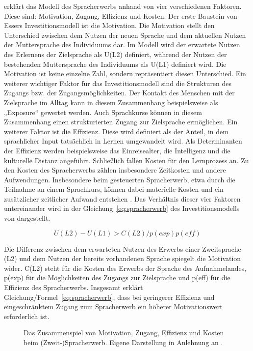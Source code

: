 \textcite{Esser:2006} erklärt das Modell des Spracherwerbs anhand von vier verschiedenen Faktoren. Diese sind: Motivation, Zugang, Effizienz und Kosten. Der erste Baustein von Essers Investitionsmodell ist die Motivation. Die Motivation stellt den Unterschied zwischen dem Nutzen der neuen Sprache und dem aktuellen Nutzen der Muttersprache des Individuums dar. Im Modell wird der erwartete Nutzen des Erlernens der Zielsprache als U(L2) definiert, während der Nutzen der bestehenden Muttersprache des Individuums als U(L1) definiert wird. Die Motivation ist keine einzelne Zahl, sondern repräsentiert diesen Unterschied. Ein weiterer wichtiger Faktor für das Investitionsmodell sind die Strukturen des Zugangs bzw. der Zugangsmöglichkeiten. Der Kontakt des Menschen mit der Zielsprache im Alltag kann in diesem Zusammenhang beispielsweise als „Exposure“ gewertet werden. Auch Sprachkurse können in diesem Zusammenhang einen strukturierten Zugang zur Zielsprache ermöglichen. Ein weiterer Faktor ist die Effizienz. Diese wird definiert als der Anteil, in dem sprachlicher Input tatsächlich in Lernen umgewandelt wird. Als Determinanten der Effizienz werden beispielsweise das Einreisealter, die Intelligenz und die kulturelle Distanz angeführt. Schließlich fallen Kosten für den Lernprozess an. Zu den Kosten des Spracherwerbs zählen insbesondere Zeitkosten und andere Aufwendungen. Insbesondere beim gesteuerten Spracherwerb, etwa durch die Teilnahme an einem Sprachkurs, können dabei materielle Kosten und ein zusätzlicher zeitlicher Aufwand entstehen \parencite[82--89]{Esser:2006}. Das Verhältnis dieser vier Faktoren untereinander wird in der Gleichung~\eqref{eq:spracherwerb} des Investitionsmodells von \textcite{Esser:2006} dargestellt.

\begin{equation}
	U(L2) - U(L1) > C(L2) / p(exp) p(eff)
	\label{eq:spracherwerb}
\end{equation}

Die Differenz zwischen dem erwarteten Nutzen des Erwerbs einer Zweitsprache (L2) und dem Nutzen der bereits vorhandenen Sprache spiegelt die Motivation wider. C(L2) steht für die Kosten des Erwerbs der Sprache des Aufnahmelandes, p(exp) für die Möglichkeiten des Zugangs zur Zielsprache und p(eff) für die Effizienz des Spracherwerbs. Insgesamt erklärt Gleichung/Formel~\eqref{eq:spracherwerb}, dass bei geringerer Effizienz und eingeschränktem Zugang zum Spracherwerb ein höherer Motivationswert erforderlich ist.


\begin{figure}[htbp]
	\centering
	\resizebox{\textwidth}{!}{%
	}
	\caption[Motivation, Zugang, Effizienz und Kosten beim Spracherwerb]{%
		Das Zusammenspiel von Motivation, Zugang, Effizienz und Kosten beim
		(Zweit-)Spracherwerb. Eigene Darstellung in Anlehnung an
		\textcite[76]{Esser:2006}.}
	\label{fig:spracherwerb}
\end{figure}


